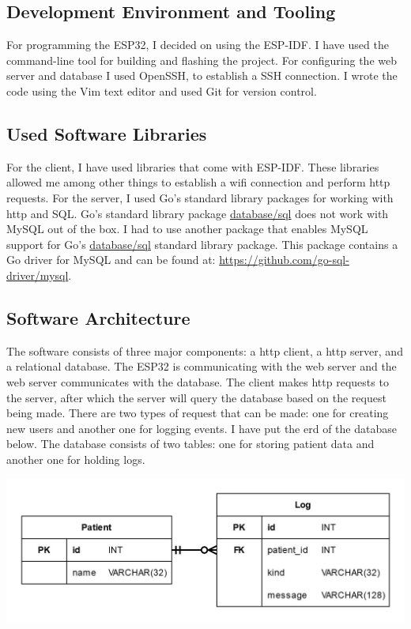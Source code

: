 \subsection{Development Environment and Tooling}

For programming the ESP32, I decided on using the ESP-IDF.
I have used the  command-line tool for building and flashing the project.
For configuring the web server and database I used OpenSSH, to establish a SSH connection.
I wrote the code using the Vim text editor and used Git for version control.

\subsection{Used Software Libraries}

For the client, I have used libraries that come with ESP-IDF.
These libraries allowed me among other things to establish a \gls{wifi} connection and perform \gls{http} requests.
For the server, I used Go's standard library packages for working with \gls{http} and SQL.
Go's standard library package \href{https://pkg.go.dev/database/sql}{database/sql} does not work with MySQL out of the box.
I had to use another package that enables MySQL support for Go's \href{https://pkg.go.dev/database/sql}{database/sql} standard library package.
This package contains a Go driver for MySQL and can be found at: \url{https://github.com/go-sql-driver/mysql}.

\subsection{Software Architecture}

The software consists of three major components: a \gls{http} client, a \gls{http} server, and a relational database.
The ESP32 is communicating with the web server and the web server communicates with the database.
The client makes \gls{http} requests to the server, after which the server will query the database based on the request being made.
There are two types of request that can be made: one for creating new users and another one for logging events.
I have put the \gls{erd} of the database below.
The database consists of two tables: one for storing patient data and another one for holding logs.

\begin{center}
\includegraphics[width=\textwidth]{images/erd}
\end{center}

